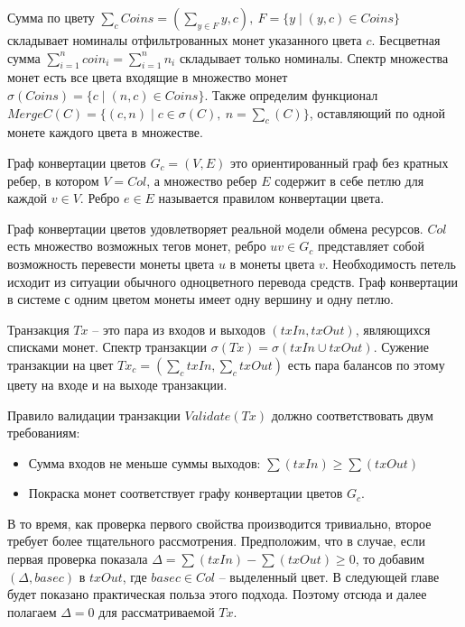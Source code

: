 \documentclass[specification,annotation]{itmo-student-thesis}
\begin{document}
Сумма по цвету $\sum_c{Coins} = (\sum_{y \in F}{y}, c), \ F = \{y \mid
(y,c) \in Coins\}$ складывает номиналы отфильтрованных монет
указанного цвета $c$. Бесцветная сумма $\sum_{i=1}^n{coin_i} =
\sum_{i=1}^n{n_i}$ складывает только номиналы. Спектр множества монет
есть все цвета входящие в множество монет $\sigma(Coins) = \{c \mid
(n,c) \in Coins\}$. Также определим функционал $MergeC(C) = \{(c,n)
\mid c \in \sigma(C), \ n = \sum_c(C)\}$, оставляющий по одной монете
каждого цвета в множестве.

\begin{definition}
Граф конвертации цветов $G_c = (V,E)$ это ориентированный граф без
кратных ребер, в котором $V = Col$, а множество ребер $E$ содержит в
себе петлю для каждой $v \in V$. Ребро $e \in E$ называется правилом
конвертации цвета.
\end{definition}

Граф конвертации цветов удовлетворяет реальной модели обмена
ресурсов. $Col$ есть множество возможных тегов монет, ребро $uv \in
G_c$ представляет собой возможность перевести монеты цвета $u$ в
монеты цвета $v$. Необходимость петель исходит из ситуации обычного
одноцветного перевода средств. Граф конвертации в системе с одним
цветом монеты имеет одну вершину и одну петлю.

\begin{definition}
Транзакция $Tx$ -- это пара из входов и выходов $(txIn, txOut)$,
являющихся списками монет. Спектр транзакции $\sigma(Tx) = \sigma(txIn
\cup txOut)$. Сужение транзакции на цвет $Tx_c = (\sum_c{txIn},
\sum_c{txOut})$ есть пара балансов по этому цвету на входе и на выходе
транзакции.
\end{definition}

Правило валидации транзакции $Validate(Tx)$ должно соответствовать
двум требованиям:
\begin{itemize}
\item Сумма входов не меньше суммы выходов: $\sum(txIn) \geq \sum(txOut)$
\item Покраска монет соответствует графу конвертации цветов $G_c$.
\end{itemize}

В то время, как проверка первого свойства производится тривиально,
второе требует более тщательного рассмотрения. Предположим, что в
случае, если первая проверка показала $\Delta = \sum(txIn) -
\sum(txOut) \geq 0$, то добавим $(\Delta, basec)$ в $txOut$, где
$basec \in Col$ -- выделенный цвет. В следующей главе будет показано
практическая польза этого подхода. Поэтому отсюда и далее полагаем
$\Delta = 0$ для рассматриваемой $Tx$.
\end{document}
